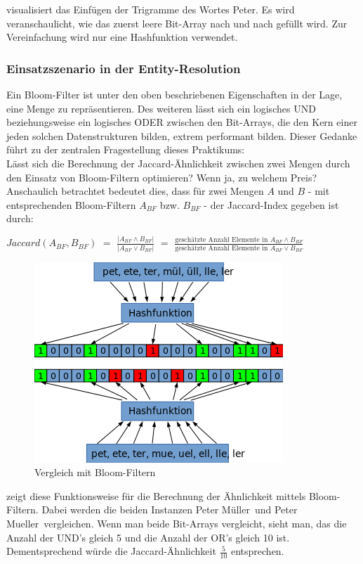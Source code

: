  visualisiert das Einfügen der Trigramme des Wortes \glqq Peter\grqq.
Es wird veranschaulicht, wie das zuerst leere Bit-Array nach und nach gefüllt wird.
Zur Vereinfachung wird nur eine Hashfunktion verwendet.

\subsubsection{Einsatzszenario in der Entity-Resolution}

Ein Bloom-Filter ist unter den oben beschriebenen Eigenschaften in der Lage, eine Menge zu repräsentieren.
Des weiteren lässt sich ein logisches UND beziehungsweise ein logisches ODER zwischen den Bit-Arrays,
die den Kern einer jeden solchen Datenstrukturen bilden, extrem performant bilden.
Dieser Gedanke führt zu der zentralen Fragestellung dieses Praktikums:\\
Lässt sich die Berechnung der Jaccard-Ähnlichkeit zwischen zwei Mengen durch den Einsatz von Bloom-Filtern
optimieren? Wenn ja, zu welchem Preis?\\

Anschaulich betrachtet bedeutet dies, dass für zwei Mengen $A$ und $B$ - mit entsprechenden Bloom-Filtern $A_{BF}$ bzw.
$B_{BF}$ - der Jaccard-Index gegeben ist durch:

$Jaccard(A_{BF}, B_{BF})$ $=$ $\frac{|A_{BF} \wedge B_{BF}|}{|A_{BF} \vee B_{BF}|}$ $=$
$\frac{\text{geschätzte Anzahl Elemente in } A_{BF} \wedge B_{BF}}{\text{geschätzte Anzahl Elemente in } A_{BF} \vee B_{BF}}$\\
\begin{figure}
	\includegraphics[width=.48\textwidth]{bloom_filter_vergleich.png}
	\caption{Vergleich mit Bloom-Filtern}
	\label{fig:sim_bf}
	\vspace*{-2cm}
\end{figure}

 zeigt diese Funktionsweise für die Berechnung der Ähnlichkeit mittels Bloom-Filtern.
Dabei werden die beiden Instanzen \glqq Peter Müller\grqq~und \glqq Peter Mueller\grqq~vergleichen.
Wenn man beide Bit-Arrays vergleicht, sieht man,
das die Anzahl der UND's gleich 5 und die Anzahl der OR's gleich 10 ist.
Dementsprechend würde die Jaccard-Ähnlichkeit $\frac{5}{10}$ entsprechen.

